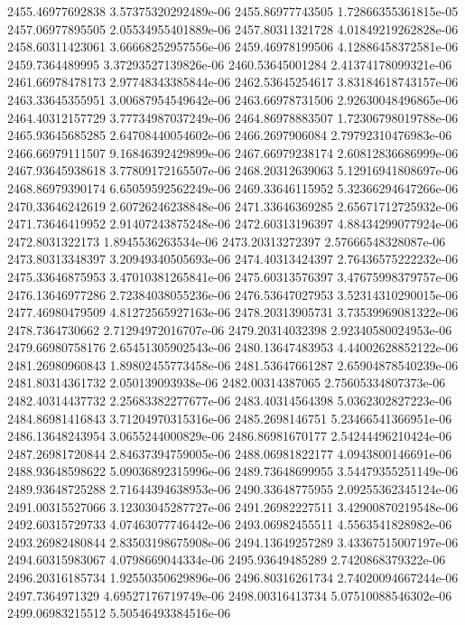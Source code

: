 {2455.46977692838 3.57375320292489e-06
2455.86977743505 1.72866355361815e-05
2457.06977895505 2.05534955401889e-06
2457.80311321728 4.01849219262828e-06
2458.60311423061 3.66668252957556e-06
2459.46978199506 4.12886458372581e-06
2459.7364489995 3.37293527139826e-06
2460.53645001284 2.41374178099321e-06
2461.66978478173 2.97748343385844e-06
2462.53645254617 3.83184618743157e-06
2463.33645355951 3.00687954549642e-06
2463.66978731506 2.92630048496865e-06
2464.40312157729 3.77734987037249e-06
2464.86978883507 1.72306798019788e-06
2465.93645685285 2.64708440054602e-06
2466.2697906084 2.79792310476983e-06
2466.66979111507 9.16846392429899e-06
2467.66979238174 2.60812836686999e-06
2467.93645938618 3.77809172165507e-06
2468.20312639063 5.12916941808697e-06
2468.86979390174 6.65059592562249e-06
2469.33646115952 5.32366294647266e-06
2470.33646242619 2.60726246238848e-06
2471.33646369285 2.65671712725932e-06
2471.73646419952 2.91407243875248e-06
2472.60313196397 4.88434299077924e-06
2472.8031322173 1.8945536263534e-06
2473.20313272397 2.57666548328087e-06
2473.80313348397 3.20949340505693e-06
2474.40313424397 2.76436575222232e-06
2475.33646875953 3.47010381265841e-06
2475.60313576397 3.47675998379757e-06
2476.13646977286 2.72384038055236e-06
2476.53647027953 3.52314310290015e-06
2477.46980479509 4.81272565927163e-06
2478.20313905731 3.73539969081322e-06
2478.7364730662 2.71294972016707e-06
2479.20314032398 2.92340580024953e-06
2479.66980758176 2.65451305902543e-06
2480.13647483953 4.44002628852122e-06
2481.26980960843 1.89802455773458e-06
2481.53647661287 2.65904878540239e-06
2481.80314361732 2.050139093938e-06
2482.00314387065 2.75605334807373e-06
2482.40314437732 2.25683382277677e-06
2483.40314564398 5.0362302827223e-06
2484.86981416843 3.71204970315316e-06
2485.2698146751 5.23466541366951e-06
2486.13648243954 3.0655244000829e-06
2486.86981670177 2.54244496210424e-06
2487.26981720844 2.84637394759005e-06
2488.06981822177 4.0943800146691e-06
2488.93648598622 5.09036892315996e-06
2489.73648699955 3.54479355251149e-06
2489.93648725288 2.71644394638953e-06
2490.33648775955 2.09255362345124e-06
2491.00315527066 3.12303045287727e-06
2491.26982227511 3.42900870219548e-06
2492.60315729733 4.07463077746442e-06
2493.06982455511 4.5563541828982e-06
2493.26982480844 2.83503198675908e-06
2494.13649257289 3.43367515007197e-06
2494.60315983067 4.0798669044334e-06
2495.93649485289 2.7420868379322e-06
2496.20316185734 1.92550350629896e-06
2496.80316261734 2.74020094667244e-06
2497.7364971329 4.69527176719749e-06
2498.00316413734 5.07510088546302e-06
2499.06983215512 5.50546493384516e-06
}
